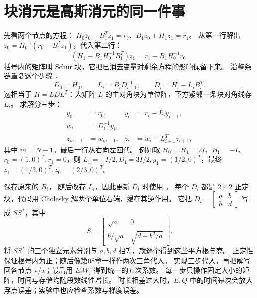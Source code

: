 \section{块消元是高斯消元的同一件事}
先看两个节点的方程：
$H_0z_0+B_1^Tz_1=r_0$、$B_1z_0+H_1z_1=r_1$。
从第一行解出 $z_0=H_0^{-1}(r_0-B_1^Tz_1)$，代入第二行：
\[
 (H_1-B_1H_0^{-1}B_1^T)z_1=r_1-B_1H_0^{-1}r_0.
\]
括号内的矩阵叫 Schur 块，它把已消去变量对剩余方程的影响保留下来。
沿整条链重复这个步骤：
\begin{equation}
 D_0=H_0,\qquad L_i=B_iD_{i-1}^{-1},\qquad
 D_i=H_i-L_iB_i^T.
 \label{eq:spline-schur}
\end{equation}
这相当于 $H=LDL^T$：大矩阵 $L$ 的主对角块为单位阵，下方紧邻一条块对角线存 $L_i$。
求解分三步：
\begin{align*}
 y_0&=r_0, & y_i&=r_i-L_i y_{i-1},\\
 w_i&=D_i^{-1}y_i,\\
 z_{m-1}&=w_{m-1}, & z_i&=w_i-L_{i+1}^Tz_{i+1},
\end{align*}
其中 $m=N-1$。最后一行从右向左回代。
例如取 $H_0=H_1=2I$、$B_1=-I$、$r_0=(1,0)^T,r_1=0$，则
$L_1=-I/2,D_1=3I/2,y_1=(1/2,0)^T$，最终
$z_1=(1/3,0)^T,z_0=(2/3,0)^T$。

\par\noindent\begin{minipage}{\linewidth}

\end{minipage}\par
{} 保存原来的 $B_i$， 随后改存 $L_i$，因此更新 $D_i$ 时使用 。
每个 $D_i$ 都是 $2\times2$ 正定块，代码用 Cholesky 解两个单位右端，缓存其逆作用。
它把 $D_i=\left[\begin{smallmatrix}a&b\\b&d\end{smallmatrix}\right]$ 写成 $SS^T$，其中
\[
 S=\begin{bmatrix}\sqrt a&0\\b/\sqrt a&\sqrt{d-b^2/a}\end{bmatrix}.
\]
将 $SS^T$ 的三个独立元素分别与 $a,b,d$ 相等，就逐个得到这些平方根与商。
正定性保证根号内为正；随后像第08章一样作两次三角代入。
 实现三步代入，再把解写回各节点 v/a；最后用 $E_iW_i$ 得到统一的五次系数。
每一步只操作固定大小的矩阵，时间与存储均随段数线性增长。
时长相差过大时，$E,Q$ 中的时间幂次会放大浮点误差；实验中也应检查系数与梯度误差。

